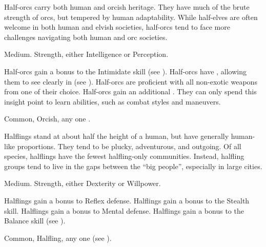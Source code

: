 
  Half-orcs carry both human and orcish heritage.
  They have much of the brute strength of orcs, but tempered by human adaptability.
  While half-elves are often welcome in both human and elvish societies, half-orcs tend to face more challenges navigating both human and orc societies.

   Medium.
    Strength, either  Intelligence or  Perception.
  \begin{raggeditemize}
     Half-orcs gain a  bonus to the Intimidate skill (see ).
     Half-orcs have , allowing them to see clearly in  (see ).
     Half-orcs are proficient with all non-exotic weapons from one  of their choice.
     Half-orcs gain an additional .
      They can only spend this insight point to learn  abilities, such as combat styles and maneuvers.
  \end{raggeditemize}
   Common, Orcish, any one .


  Halflings stand at about half the height of a human, but have generally human-like proportions.
  They tend to be plucky, adventurous, and outgoing.
  Of all species, halflings have the fewest halfling-only communities.
  Instead, halfling groups tend to live in the gaps between the ``big people'', especially in large cities.

   Medium.
    Strength, either  Dexterity or  Willpower.
  \begin{raggeditemize}
     Halflings gain a  bonus to Reflex defense.
     Halflings gain a  bonus to the Stealth skill.
     Halflings gain a  bonus to Mental defense.
     Halflings gain a  bonus to the Balance skill (see ).
  \end{raggeditemize}
   Common, Halfling, any one  (see ).

